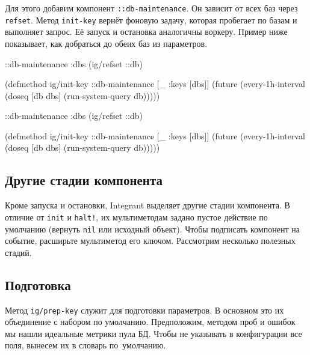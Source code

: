 Для этого добавим компонент \texttt{::db-main\-te\-nance}. Он зависит от всех баз
через \verb|refset|. Метод \verb|init-key| вернёт фоновую задачу, которая
пробегает по базам и выполняет запрос. Её запуск и остановка аналогичны
воркеру. Пример ниже показывает, как добраться до обеих баз из параметров.

\ifx\DEVICETYPE\MOBILE

\begin{english}
  \begin{clojure}
{::db-maintenance
 {:dbs (ig/refset ::db)}}

(defmethod ig/init-key ::db-maintenance
  [_ {:keys [dbs]}]
  (future
    (every-1h-interval
      (doseq [db dbs]
        (run-system-query db)))))
  \end{clojure}
\end{english}

\else

\begin{english}
  \begin{clojure}
{::db-maintenance {:dbs (ig/refset ::db)}}

(defmethod ig/init-key ::db-maintenance
  [_ {:keys [dbs]}]
  (future
    (every-1h-interval
      (doseq [db dbs]
        (run-system-query db)))))
  \end{clojure}
\end{english}

\fi

\subsection{Другие стадии компонента}


Кроме запуска и остановки, Integrant выделяет другие стадии компонента. В
отличие от \verb|init| и \verb|halt!|, их мультиметодам задано пустое действие
по умолчанию (вернуть \verb|nil| или исходный объект). Чтобы подписать компонент
на событие, расширьте мультиметод его ключом. Рассмотрим несколько полезных
стадий.

\subsection{Подготовка}

Метод \verb|ig/prep-key| служит для подготовки параметров. В основном это их
объединение с набором по умолчанию. Предположим, методом проб и ошибок мы нашли
идеальные метрики пула БД. Чтобы не указывать в конфигурации все поля, вынесем
их в словарь по~умолчанию.

